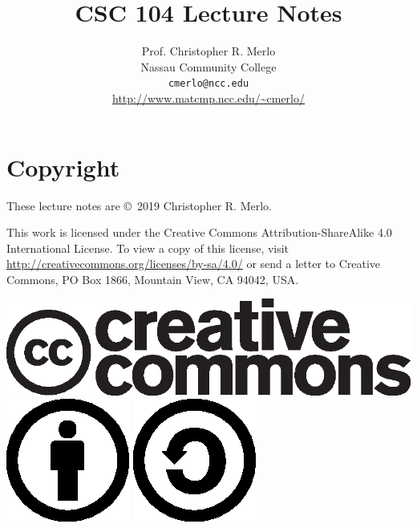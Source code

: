 \documentclass[12pt,twoside]{book}
\title{{\color{mLightBrown}\textbf{CSC 104 Lecture Notes}}\\}
\author{Prof. Christopher R. Merlo\\
Nassau Community College\\
\texttt{cmerlo@ncc.edu}\\
\url{http://www.matcmp.ncc.edu/~cmerlo/}
}
\begin{document}
\frontmatter

\let\stdsection\section

\newcommand{\code}[1]{\textcolor{mLightBrown}{\textsf{#1}}}
\newcommand{\prop}[2]{\label{prop:#1}\textcolor{mLightBrown}{\textsf{\textbf{Proposition #1:}}} \textit{#2}}
\newcommand{\qed}{~\hfill\textcolor{mLightBrown}{$\blacksquare$}}

\renewcommand{\labelitemi}{\textcolor{mLightBrown}{$\bullet$}}
\renewcommand{\labelitemii}{\textcolor{mLightBrown}{$\bullet$}}
\renewcommand{\labelenumi}{\textcolor{mLightBrown}{\theenumi.}}

\maketitle

\chapter{Copyright}

These lecture notes are \copyright~2019 Christopher R. Merlo.

This work is licensed under the Creative Commons Attribution-ShareAlike 4.0 International License. To view a copy of this license, visit \url{http://creativecommons.org/licenses/by-sa/4.0/} or send a letter to Creative Commons, PO Box 1866, Mountain View, CA 94042, USA.

\vfill\vfill

\begin{center}
\includegraphics[scale=0.85]{cc.logo.eps}
\includegraphics{by.eps}
\includegraphics{sa.eps}
\end{center}
\end{document}
